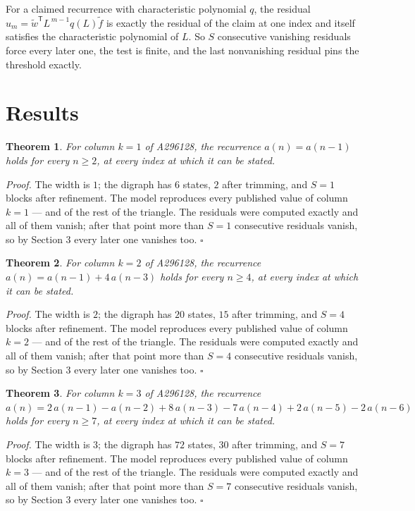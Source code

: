 \documentclass[11pt]{article}
\newtheorem{theorem}{Theorem}
\theoremstyle{definition}
\begin{document}
For a claimed recurrence with characteristic polynomial $q$, the residual $u_m = \tilde w^{\mathsf T}L^{\,m-1}q(L)\tilde f$ is exactly the residual of the claim at one index and itself satisfies the characteristic polynomial of $L$. So $S$ consecutive vanishing residuals force every later one, the test is finite, and the last nonvanishing residual pins the threshold exactly.

\section{Results}

\begin{theorem} For column $k = 1$ of A296128, the recurrence $a(n) = a(n-1)$ holds for every $n \ge 2$, at every index at which it can be stated.\end{theorem}

{\itshape Proof.} The width is $1$; the digraph has $6$ states, $2$ after trimming, and $S = 1$ blocks after refinement. The model reproduces every published value of column $k = 1$ --- and of the rest of the triangle. The residuals were computed exactly and all of them vanish; after that point more than $S = 1$ consecutive residuals vanish, so by Section 3 every later one vanishes too. $\square$

\begin{theorem} For column $k = 2$ of A296128, the recurrence $a(n) = a(n-1) + 4\,a(n-3)$ holds for every $n \ge 4$, at every index at which it can be stated.\end{theorem}

{\itshape Proof.} The width is $2$; the digraph has $20$ states, $15$ after trimming, and $S = 4$ blocks after refinement. The model reproduces every published value of column $k = 2$ --- and of the rest of the triangle. The residuals were computed exactly and all of them vanish; after that point more than $S = 4$ consecutive residuals vanish, so by Section 3 every later one vanishes too. $\square$

\begin{theorem} For column $k = 3$ of A296128, the recurrence $a(n) = 2\,a(n-1) - a(n-2) + 8\,a(n-3) - 7\,a(n-4) + 2\,a(n-5) - 2\,a(n-6)$ holds for every $n \ge 7$, at every index at which it can be stated.\end{theorem}

{\itshape Proof.} The width is $3$; the digraph has $72$ states, $30$ after trimming, and $S = 7$ blocks after refinement. The model reproduces every published value of column $k = 3$ --- and of the rest of the triangle. The residuals were computed exactly and all of them vanish; after that point more than $S = 7$ consecutive residuals vanish, so by Section 3 every later one vanishes too. $\square$
\end{document}
